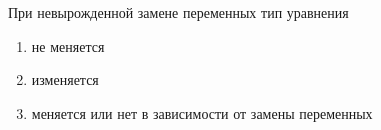 При невырожденной замене переменных тип уравнения

\begin{enumerate}[label=\arabic*)]
    \item не меняется
    \item изменяется
    \item меняется или нет в зависимости от замены переменных
\end{enumerate}

